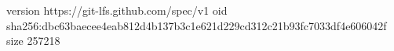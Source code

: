 version https://git-lfs.github.com/spec/v1
oid sha256:dbc63baecee4eab812d4b137b3c1e621d229cd312c21b93fc7033df4e606042f
size 257218
